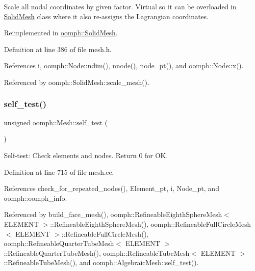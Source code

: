 Scale all nodal coordinates by given factor. Virtual so it can be overloaded in \hyperlink{classoomph_1_1SolidMesh}{Solid\+Mesh} class where it also re-\/assigns the Lagrangian coordinates. 



Reimplemented in \hyperlink{classoomph_1_1SolidMesh_a65a49a75f83674d7fbcf5c3ee05d7253}{oomph\+::\+Solid\+Mesh}.



Definition at line 386 of file mesh.\+h.



References i, oomph\+::\+Node\+::ndim(), nnode(), node\+\_\+pt(), and oomph\+::\+Node\+::x().



Referenced by oomph\+::\+Solid\+Mesh\+::scale\+\_\+mesh().

\mbox{\label{classoomph_1_1Mesh_ac713e5a9cbd8b21907d39df493d6bfc9}} 
\subsubsection{\texorpdfstring{self\+\_\+test()}{self\_test()}}
{\footnotesize\ttfamily unsigned oomph\+::\+Mesh\+::self\+\_\+test (\begin{DoxyParamCaption}{ }\end{DoxyParamCaption})}



Self-\/test\+: Check elements and nodes. Return 0 for OK. 



Definition at line 715 of file mesh.\+cc.



References check\+\_\+for\+\_\+repeated\+\_\+nodes(), Element\+\_\+pt, i, Node\+\_\+pt, and oomph\+::oomph\+\_\+info.



Referenced by build\+\_\+face\+\_\+mesh(), oomph\+::\+Refineable\+Eighth\+Sphere\+Mesh$<$ E\+L\+E\+M\+E\+N\+T $>$\+::\+Refineable\+Eighth\+Sphere\+Mesh(), oomph\+::\+Refineable\+Full\+Circle\+Mesh$<$ E\+L\+E\+M\+E\+N\+T $>$\+::\+Refineable\+Full\+Circle\+Mesh(), oomph\+::\+Refineable\+Quarter\+Tube\+Mesh$<$ E\+L\+E\+M\+E\+N\+T $>$\+::\+Refineable\+Quarter\+Tube\+Mesh(), oomph\+::\+Refineable\+Tube\+Mesh$<$ E\+L\+E\+M\+E\+N\+T $>$\+::\+Refineable\+Tube\+Mesh(), and oomph\+::\+Algebraic\+Mesh\+::self\+\_\+test().

